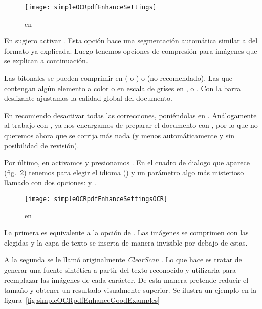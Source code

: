 \documentclass[%
	a5paper,
	10pt,
	twoside,
	openright,
	final,
]{memoir}
\begin{document}
	\begin{figure}
		\texttt{[image: simpleOCRpdfEnhanceSettings]}
		\caption{ en \acrobat\label{fig:simpleOCRpdfEnhanceSettings}}
	\end{figure}

	En  sugiero activar . Esta opción hace una segmentación automática similar a del formato \djvu ya explicada. Luego tenemos opciones de compresión para imágenes que se explican a continuación.

	Las bitonales se pueden comprimir en  ( o ) o  (no recomendado). Las que contengan algún elemento a color o en escala de grises en ,  o . Con la barra deslizante ajustamos la calidad global del documento.

	En  recomiendo desactivar todas las correcciones, poniéndolas en . Análogamente al trabajo con \abby, ya nos encargamos de preparar el documento con \scantailor, por lo que no queremos ahora que se corrija más nada (y menos automáticamente y sin posibilidad de revisión).

	Por último, en  activamos  y presionamos . En el cuadro de dialogo que aparece (fig.~\ref{fig:simpleOCRpdfEnhanceSettingsOCR}) tenemos para elegir el idioma () y un parámetro algo más misterioso llamado  con dos opciones:  y .

	\begin{figure}
		\centering
		\texttt{[image: simpleOCRpdfEnhanceSettingsOCR]}
		\caption{ en \acrobat\label{fig:simpleOCRpdfEnhanceSettingsOCR}}
	\end{figure}

	La primera es equivalente a la opción  de \abby. Las imágenes se comprimen con las  elegidas y la capa de texto se inserta de manera invisible por debajo de estas.

	A la segunda se le llamó originalmente \emph{ClearScan} \cite{ClearScan}. Lo que hace es tratar de generar una fuente sintética a partir del texto reconocido y utilizarla para reemplazar las imágenes de cada carácter. De esta manera pretende reducir el tamaño y obtener un resultado visualmente superior. Se ilustra un ejemplo en la figura~\ref{fig:simpleOCRpdfEnhanceGoodExamples}
\end{document}
